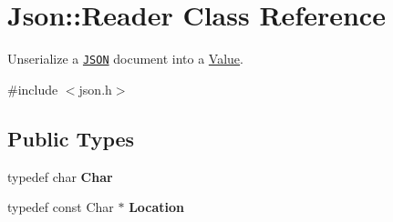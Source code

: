 \hypertarget{class_json_1_1_reader}{\section{Json\-:\-:Reader Class Reference}
\label{class_json_1_1_reader}
}


Unserialize a \href{http://www.json.org}{\tt J\-S\-O\-N} document into a \hyperlink{class_json_1_1_value}{Value}.  




{\ttfamily \#include $<$json.\-h$>$}

\subsection*{Public Types}
\begin{DoxyCompactItemize}
\item 
\hypertarget{class_json_1_1_reader_a3eec9118f3e9a672ba8348c3a79d0f45}{typedef char {\bfseries Char}}\label{class_json_1_1_reader_a3eec9118f3e9a672ba8348c3a79d0f45}

\item 
\hypertarget{class_json_1_1_reader_a46795b5b272bf79a7730e406cb96375a}{typedef const Char $\ast$ {\bfseries Location}}\label{class_json_1_1_reader_a46795b5b272bf79a7730e406cb96375a}

\end{DoxyCompactItemize}
